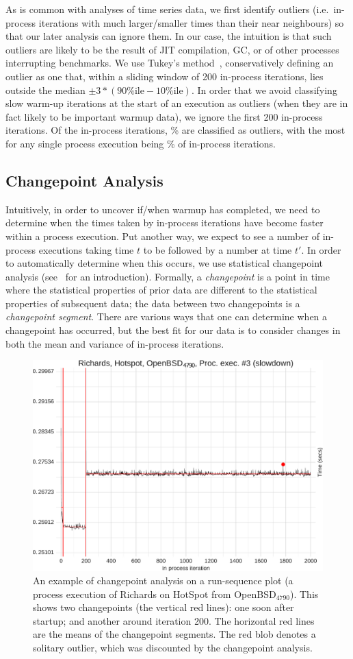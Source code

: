 \documentclass[preprint,numbers,10pt]{sigplanconf}
\newcommand{\benchersix}{OpenBSD$_\mathrm{4790}$\xspace}
\begin{document}
As is common with analyses of time series data, we first identify outliers
(i.e.~in-process iterations with much larger/smaller times than their near
neighbours) so that our later analysis can ignore them. In our case, the
intuition is that such outliers are likely to be the result of JIT compilation,
GC, or of other processes interrupting benchmarks. We use Tukey's
method~\cite{tukey1977exploratory}, conservatively defining an outlier as one that, within a
sliding window of 200 in-process iterations, lies outside the median $\pm
3*(90\%\textrm{ile} - 10\%\textrm{ile})$. In order that we avoid classifying
slow warm-up iterations at the start of an execution as outliers (when they are
in fact likely to be important warmup data), we ignore the first 200 in-process
iterations. Of the \totaliterations\xspace in-process
iterations, \totaloutlierspercentage\% are classified as outliers, with the most for
%
any single process execution being \result\% of in-process iterations.


\subsection{Changepoint Analysis}

Intuitively, in order to uncover if/when warmup has completed, we need to
determine when the times taken by in-process iterations have become faster
within a process execution. Put another way, we expect to see a number of in-process
executions taking time $t$ to be followed by a number at time $t'$. In order to
automatically determine when this occurs, we use statistical changepoint analysis
(see~\cite{EckleyFearnheadKillick2011} for an introduction). Formally, a
\emph{changepoint} is a point in time where the statistical properties of prior
data are different to the statistical properties of subsequent data; the data
between two changepoints is a \emph{changepoint segment}. There are various
ways that one can determine when a changepoint has occurred, but the best fit
for our data is to consider changes in both the mean and variance of in-process
iterations.

\begin{figure}[t]
\centering
\includegraphics[width=.45\textwidth]{examples/changepoint_example.pdf}
\caption{An example of changepoint analysis on a run-sequence plot (a process
execution of Richards on HotSpot from \benchersix). This shows two changepoints
(the vertical red lines): one soon after startup; and another around iteration
200. The horizontal red lines are the means of the changepoint segments. The red
blob denotes a solitary outlier, which was discounted by the changepoint analysis.}
\label{fig:changepoint}
\end{figure}
\end{document}
